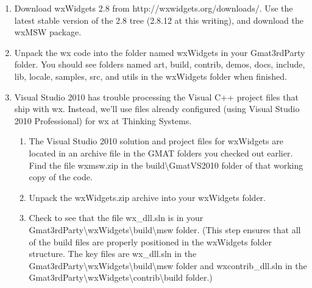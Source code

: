 \documentclass[letterpaper,10pt]{article}%
\begin{document}
\begin{enumerate}
\item Download wxWidgets 2.8 from http://wxwidgets.org/downloads/.  Use the latest stable version of the 2.8 tree (2.8.12 at this writing), and download the wxMSW package.
\item Unpack the wx code into the folder named wxWidgets in your Gmat3rdParty folder.  You should see folders named art, build, contrib, demos, docs, include, lib, locale, samples, src, and utils in the wxWidgets folder when finished.
\item Visual Studio 2010 has trouble processing the Visual C++ project files that ship with wx.  Instead, we'll use files already configured (using Visual Studio 2010 Professional) for wx at Thinking Systems. 
\begin{enumerate}
\item The Visual Studio 2010 solution and project files for wxWidgets are located in an archive file in the GMAT folders you checked out earlier.  Find the file wxmsw.zip in the build\textbackslash GmatVS2010 folder of that working copy of the code.
\item Unpack the wxWidgets.zip archive into your wxWidgets folder.
\item Check to see that the file wx\_dll.sln is in your Gmat3rdParty\textbackslash wxWidgets\textbackslash build\textbackslash msw folder.  (This step ensures that all of the build files are properly positioned in the wxWidgets folder structure.  The key files are wx\_dll.sln in the Gmat3rdParty\textbackslash wxWidgets\textbackslash build\textbackslash msw folder and wxcontrib\_dll.sln in the Gmat3rdParty\textbackslash wxWidgets\textbackslash contrib\textbackslash build folder.) 
\end{enumerate}
 
\end{enumerate}
\end{document}
